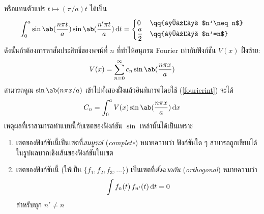 หรือแทนตัวแปร $t\mapsto(\pi/a)t$ ได้เป็น
\begin{equation}
    \int_0^a\sin\ab(\frac{n\pi t}{a})\sin\ab(\frac{n'\pi t}{a})\odif{t}=\begin{cases}
        0&\qq{ถ้า $n'\neq n$}\\
        \dfrac{a}{2}&\qq{ถ้า $n'=n$}
    \end{cases}\label{fourierint}
\end{equation}
ดังนั้นถ้าต้องการหาสัมประสิทธิ์ของพจน์ที่ $n$ ที่ทำให้อนุกรม Fourier เท่ากับฟังก์ชัน $V(x)$ ฝั่งซ้าย:
\[V(x)=\sum_{n=0}^\infty c_n\sin\ab(\frac{n\pi x}{a})\]
สามารถคูณ $\sin\ab(n\pi x/a)$ เข้าไปทั้งสองฝั่งแล้วอินทิเกรตโดยใช้ (\ref{fourierint}) จะได้
\begin{equation}
    C_n=\int_0^a V(x)\sin\ab(\frac{n\pi x}{a})\odif{x}
\end{equation}
เหตุผลที่เราสามารถทำแบบนี้กับเซตของฟังก์ชัน $\sin$ เหล่านั้นได้เป็นเพราะ
\begin{enumerate}
    \item เซตของฟังก์ชันนี้เป็นเซตที่\emph{สมบูรณ์} (\emph{complete}) หมายความว่า ฟังก์ชันใด ๆ สามารถถูกเขียนได้ในรูปผลบวกเชิงเส้นของฟังก์ชันในเซต
    \item เซตของฟังก์ชันนี้ (ให้เป็น $\{f_1,f_2,f_3,\dots\}$) เป็นเซตที่\emph{ตั้งฉากกัน} (\emph{orthogonal}) หมายความว่า
    \[\int f_n(t)\,f_{n'}(t)\odif{t}=0\]
    สำหรับทุก $n'\neq n$
\end{enumerate}
